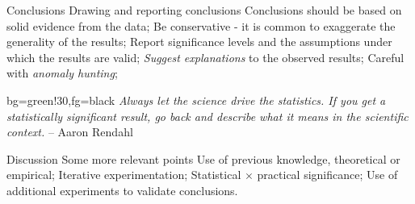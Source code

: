 \documentclass[t]{beamer}
\begin{document}
\begin{ftst}
{Conclusions}
{Drawing and reporting conclusions}
\bitems Conclusions should be based on solid evidence from the data;
	\spitem Be conservative - it is common to exaggerate the generality of the results;
	\spitem Report significance levels and the assumptions under which the results are valid;
	\spitem \textit{Suggest explanations} to the observed results;
	\spitem Careful with \textit{anomaly hunting};
\eitem

\begin{colorblock}{}{bg=green!30,fg=black}
	\small\textit{Always let the science drive the statistics. If you get a statistically significant result, go back and describe what it means in the scientific context.}
	\flushright\small -- Aaron Rendahl
\end{colorblock}
\end{ftst}

\begin{ftst}
{Discussion}
 {Some more relevant points}
\bitems Use of previous knowledge, theoretical or empirical;
	\spitem Iterative experimentation;
	\spitem Statistical $\times$ practical significance;
	\spitem Use of additional experiments to validate conclusions.
\eitem
\end{ftst}
\end{document}
